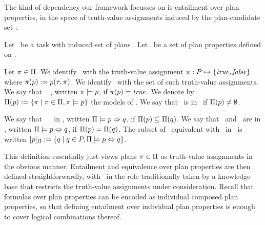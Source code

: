 The kind of dependency our framework focusses on is entailment over
plan properties, in the space of truth-value assignments induced by
the plan-candidate set \plans:

\begin{definition}[Entailment]
Let \task\ be a task with induced set of plans \plans. Let \props\ be
a set of plan properties defined on \task.

Let $\pi \in \Pi$. We identify \plan\ with the truth-value
assignment $\pi : P \mapsto \{\mathit{true}, \mathit{false}\}$ where
$\pi(p) := p(\tau,\pi)$. We identify \plans\ with the set
of such truth-value assignments. We say that
\plan\  \prop, written $\pi \models p$, if
$\pi(p) = \mathit{true}$. We denote by $\Pi(p) :=
\{\pi \mid \pi \in \Pi, \pi \models p\}$ the models of
\prop. We say that \prop\ is  in \plans\ if
$\Pi(p) \neq \emptyset$.

We say that \prop\  \propq\ in \plans, written
$\Pi \models p \Rightarrow q$, if $\Pi(p)
\subseteq \Pi(q)$.
%
We say that \prop\ and \propq\ are  in \plans,
written $\Pi \models p \Leftrightarrow q$, if $\Pi(p) =
\Pi(q)$. The subset of \props\ equivalent with
\prop\ in \plans\ is written $[p]_{\Pi} := \{q \mid
q \in P, \Pi \models p \Leftrightarrow q\}$.
\end{definition}

This definition essentially just views plans $\pi \in \Pi$ as
truth-value assignments in the obvious manner. Entailment and
equivalence over plan properties are then defined straightforwardly,
with \plans\ in the role traditionally taken by a knowledge base that
restricts the truth-value assignments under consideration. Recall that
formulas over plan properties can be encoded as individual composed
plan properties, so that defining entailment over individual plan
properties is enough to cover logical combinations thereof.

